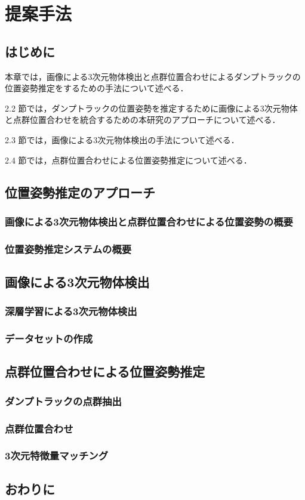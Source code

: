 \chapter{提案手法}
\thispagestyle{empty}
\label{chap2}
\minitoc

\newpage
\section{はじめに}
本章では，画像による3次元物体検出と点群位置合わせによるダンプトラックの位置姿勢推定をするための手法について述べる．
\par
2.2 節では，ダンプトラックの位置姿勢を推定するために画像による3次元物体と点群位置合わせを統合するための本研究のアプローチについて述べる．
\par
2.3 節では，画像による3次元物体検出の手法について述べる．
\par
2.4 節では，点群位置合わせによる位置姿勢推定について述べる．
\newpage

\section{位置姿勢推定のアプローチ}
\subsection{画像による3次元物体検出と点群位置合わせによる位置姿勢の概要}


\newpage
\subsection{位置姿勢推定システムの概要}
\newpage
\section{画像による3次元物体検出}
\subsection{深層学習による3次元物体検出}
\newpage
\subsection{データセットの作成}
\section{点群位置合わせによる位置姿勢推定}
\subsection{ダンプトラックの点群抽出}
\subsection{点群位置合わせ}
\subsection{3次元特徴量マッチング}
\section{おわりに}
